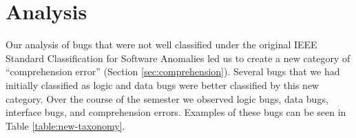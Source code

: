 \documentclass{sig-alternate}
\begin{document}
\section{Analysis}
\label{sec:analysis}

Our analysis of bugs that were not well classified under the original
IEEE Standard Classification for Software Anomalies led us to create a
new category of ``comprehension error'' (Section
\ref{sec:comprehension}). Several bugs that we had initially
classified as logic and data bugs were better classified by this new
category. Over the course of the semester we observed \numlogic logic
bugs, \numdata data bugs, \numinterface interface bugs, and \numcomp
comprehension errors. Examples of these bugs can be seen in Table
\ref{table:new-taxonomy}.\\
\end{document}
